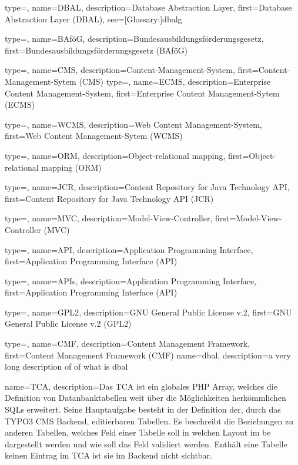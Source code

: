 {
	type=\acronymtype,
	name={DBAL},
	description={Database Abstraction Layer},
	first={Database Abstraction Layer (DBAL)},
	see=[Glossary:]{dbalg}
}

{
	type=\acronymtype,
	name={BAföG},
	description={Bundesausbildungsförderungsgesetz},
	first={Bundesausbildungsförderungsgesetz (BAföG)}
}

{
	type=\acronymtype,
	name={CMS},
	description={Content-Management-System},
	first={Content-Management-Sytem (CMS)}
}
{
	type=\acronymtype,
	name={ECMS},
	description={Enterprise Content Management-System},
	first={Enterprise Content Management-Sytem (ECMS)}
}

{
	type=\acronymtype,
	name={WCMS},
	description={Web Content Management-System},
	first={Web Content Management-Sytem (WCMS)}
}

{
	type=\acronymtype,
	name={ORM},
	description={Object-relational mapping},
	first={Object-relational mapping (ORM)}
}

{
	type=\acronymtype,
	name={JCR},
	description={Content Repository for Java Technology API},
	first={Content Repository for Java Technology API (JCR)}
}

{
	type=\acronymtype,
	name={MVC},
	description={Model-View-Controller},
	first={Model-View-Controller (MVC)}
}

{
	type=\acronymtype,
	name={API},
	description={Application Programming Interface},
	first={Application Programming Interface (API)}
}

{
	type=\acronymtype,
	name={APIs},
	description={Application Programming Interface},
	first={Application Programming Interface (API)}
}

{
	type=\acronymtype,
	name={GPL2},
	description={GNU General Public License v.2},
	first={GNU General Public License v.2 (GPL2)}
}

{
	type=\acronymtype,
	name={CMF},
	description={Content Management Framework},
	first={Content Management Framework (CMF)}
}
{
	name={dbal},
	description={a very long description of of what is dbal}
}

{
	name={TCA},
	description={Das TCA ist ein globales PHP Array, welches die Definition von Datanbanktabellen weit über die Möglichkeiten herkömmlichen SQLs erweitert. Seine Hauptaufgabe besteht in der Definition der, durch das TYPO3 CMS Backend, editierbaren Tabellen. Es beschreibt die Beziehungen zu anderen Tabellen, welches Feld einer Tabelle soll in welchen Layout im \gls{be} dargestellt werden und wie soll das Feld validiert werden. Enthält eine Tabelle keinen Eintrag im TCA ist sie im Backend nicht sichtbar.}
}
